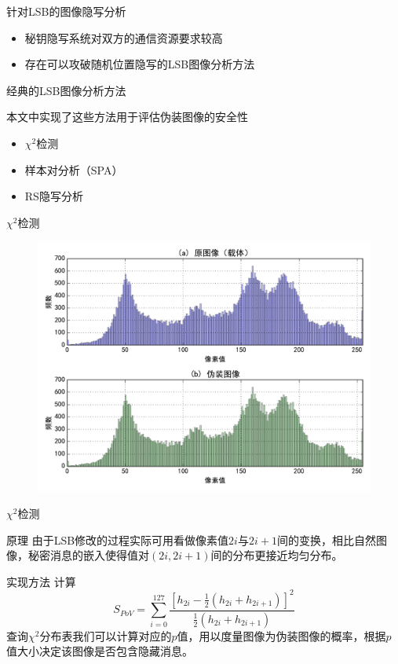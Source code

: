 \documentclass[14pt]{Bredelebeamer}
\begin{document}
\begin{frame}{针对LSB的图像隐写分析}
  \begin{itemize}
    \item 秘钥隐写系统对双方的通信资源要求较高
    \item 存在可以攻破随机位置隐写的LSB图像分析方法
      \end{itemize}
      \pause
    \begin{block}{经典的LSB图像分析方法}

      本文中实现了这些方法用于评估伪装图像的安全性
      \pause
  \begin{itemize}
    \item $\chi^2$检测
    \item 样本对分析（SPA）
    \item RS隐写分析
  \end{itemize}
    \end{block}
\end{frame}

\begin{frame}{$\chi^2$检测}
  \subtitle{值对分析：伪装图像的直方图中存在更多大致等高的像素值对}
  \begin{figure}
    \centering
    \includegraphics[width=.9\textwidth]{images/hist2}
  \end{figure}
\end{frame}

\begin{frame}{$\chi^2$检测}
  \begin{exampleblock}{原理}
  由于LSB修改的过程实际可用看做像素值$2i$与$2i+1$间的变换，相比自然图像，秘密消息的嵌入使得值对$\left( 2i , 2i+1\right)$间的分布更接近均匀分布。
\end{exampleblock}
\pause
\begin{block}{实现方法}
  计算
  $${S_{PoV}} = \sum\limits_{i = 0}^{127} {\frac{{{{\left[ {{h_{2i}} - \frac{1}{2}\left( {{h_{2i}} + {h_{2i + 1}}} \right)} \right]}^2}}}{{\frac{1}{2}\left( {{h_{2i}} + {h_{2i + 1}}} \right)}}}$$
  查询$\chi^2$分布表我们可以计算对应的\alert<3>{$p$值}，用以度量图像为伪装图像的概率，根据\alert<3>{$p$值}大小决定该图像是否包含隐藏消息。
\end{block}
\end{frame}
\end{document}
